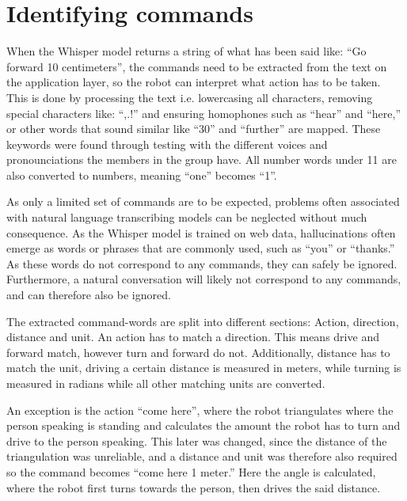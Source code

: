 \section{Identifying commands}


When the Whisper model returns a string of what has been said like: ``Go forward 10 centimeters'', the commands need to be extracted from the text on the application layer, so the robot can interpret what action has to be taken. This is done by processing the text i.e. lowercasing all characters, removing special characters like: ``,.!'' and ensuring homophones such as ``hear'' and ``here,'' or other words that sound similar like ``30'' and ``further'' are mapped. These keywords were found through testing with the different voices and pronounciations the members in the group have. All number words under 11 are also converted to numbers, meaning ``one'' becomes ``1''.

As only a limited set of commands are to be expected, problems often associated with natural language transcribing models can be neglected without much consequence. As the Whisper model is trained on web data, hallucinations often emerge as words or phrases that are commonly used, such as ``you'' or ``thanks.'' As these words do not correspond to any commands, they can safely be ignored. Furthermore, a natural conversation will likely not correspond to any commands, and can therefore also be ignored.

The extracted command-words are split into different sections: Action, direction, distance and unit. An action has to match a direction. This means drive and forward match, however turn and forward do not. Additionally, distance has to match the unit, driving a certain distance is measured in meters, while turning is measured in radians while all other matching units are converted.

An exception is the action ``come here'', where the robot triangulates where the person speaking is standing and calculates the amount the robot has to turn and drive to the person speaking. This later was changed, since the distance of the triangulation was unreliable, and a distance and unit was therefore also required so the command becomes ``come here 1 meter.'' Here the angle is calculated, where the robot first turns towards the person, then drives the said distance.
